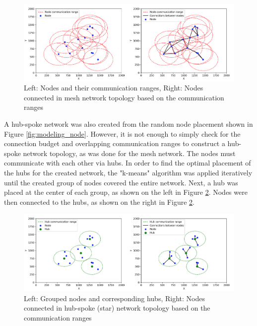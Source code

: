 \begin{figure}[H]
    \centering
    \includegraphics[width=0.75\columnwidth]{images/modeling_mesh.png}
    \caption{Left: Nodes and their communication ranges, Right: Nodes connected in mesh network topology based on the communication ranges}
    \label{fig:modeling_mesh}
\end{figure}

A hub-spoke network was also created from the random node placement shown in Figure \ref{fig:modeling_node}. However, it is not enough to simply check for the connection budget and overlapping communication ranges to construct a hub-spoke network topology, as was done for the mesh network. The nodes must communicate with each other via hubs. In order to find the optimal placement of the hubs for the created network, the "k-means" algorithm was applied iteratively until the created group of nodes covered the entire network. Next, a hub was placed at the center of each group, as shown on the left in Figure \ref{fig:modeling_star}. Nodes were then connected to the hubs, as shown on the right in Figure \ref{fig:modeling_star}.

\begin{figure}[H]
    \centering
    \includegraphics[width=0.75\columnwidth]{images/modeling_star.png}
    \caption{Left: Grouped nodes and corresponding hubs, Right: Nodes connected in hub-spoke (star) network topology based on the communication ranges}
    \label{fig:modeling_star}
\end{figure}

